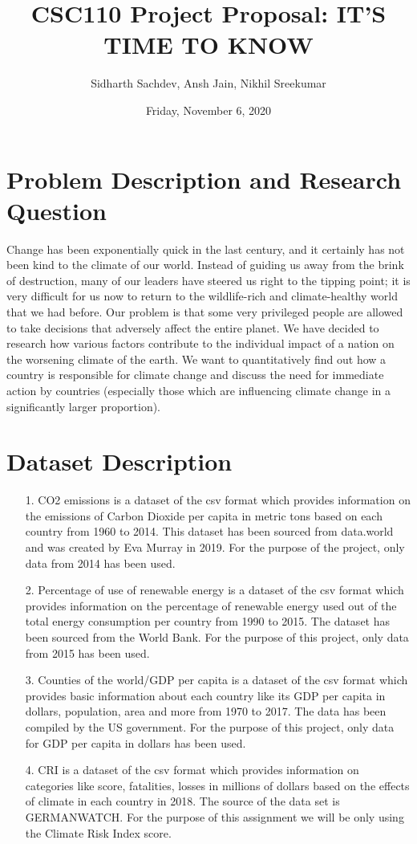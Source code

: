 \documentclass[fontsize=11pt]{article}
\title{CSC110 Project Proposal: IT'S TIME TO KNOW}
\author{Sidharth Sachdev, Ansh Jain, Nikhil Sreekumar}
\date{Friday, November 6, 2020}
\begin{document}
\maketitle

\section*{Problem Description and Research Question}

Change has been exponentially quick in the last century, and it certainly has not been kind to the climate of our world.
Instead of guiding us away from the brink of destruction, many of our leaders have steered us right to the tipping point;
it is very difficult for us now to return to the wildlife-rich and climate-healthy world that we had before.
Our problem is that some very privileged people are allowed to take decisions that adversely affect the entire planet.
 We have decided to research how various factors contribute to the individual impact of a nation on the worsening climate of the earth. We want to quantitatively find out how a country is responsible for climate change and discuss the need for immediate action by countries (especially those which are influencing climate change in a significantly larger proportion).

\section*{Dataset Description}

\begin{enumerate}
 \item [1.] CO2 emissions is a dataset of the csv format which provides information on the emissions of Carbon Dioxide per capita in metric tons based on each country from 1960 to 2014.
 This dataset has been sourced from data.world and was created by Eva Murray in 2019.
 For the purpose of the project, only data from 2014 has been used.
 \item[2.] Percentage of use of renewable energy is a dataset of the csv format which provides information on the percentage of  renewable energy used out of the total energy consumption per country from 1990 to 2015.
 The dataset has been sourced from the World Bank.
 For the purpose of this project, only data from 2015 has been used.
 \item[3.] Counties of the world/GDP per capita is a dataset of the csv format which provides basic information about each country like its GDP per capita in dollars, population, area and more from 1970 to 2017. The data has been compiled by the US government.
 For the purpose of this project, only data for GDP per capita in dollars has been used.
 \item[4.] CRI is a dataset of the csv format which provides information on categories like score, fatalities, losses in millions of dollars based on the effects of climate in each country in 2018.
 The source of the data set is GERMANWATCH. For the purpose of this assignment we will be only using the Climate Risk Index score.
\end{enumerate}
\end{document}
